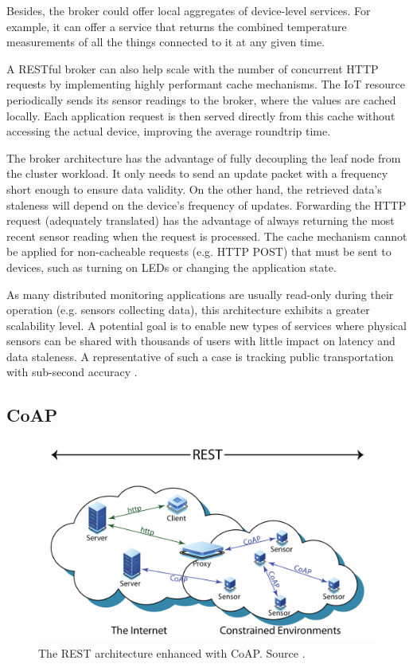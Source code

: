 Besides, the broker could offer local aggregates of device-level services. For example, it can offer a service that returns the combined temperature measurements of all the things connected to it at any given time.

A RESTful broker can also help scale with the number of concurrent HTTP requests by implementing highly performant cache mechanisms. The IoT resource periodically sends its sensor readings to the broker, where the values are cached locally. Each application request is then served directly from this cache without accessing the actual device, improving the average roundtrip time.

The broker architecture has the advantage of fully decoupling the leaf node from the cluster workload. It only needs to send an update packet with a frequency short enough to ensure data validity. On the other hand, the retrieved data's staleness will depend on the device's frequency of updates. Forwarding the HTTP request (adequately translated) has the advantage of always returning the most recent sensor reading when the request is processed. The cache mechanism cannot be applied for non-cacheable requests (e.g. HTTP POST) that must be sent to devices, such as turning on LEDs or changing the application state.

As many distributed monitoring applications are usually read-only during their operation (e.g. sensors collecting data), this architecture exhibits a greater scalability level. A potential goal is to enable new types of services where physical sensors can be shared with thousands of users with little impact on latency and data staleness. A representative of such a case is tracking public transportation with sub-second accuracy \cite{elbamby2019wireless}.

\subsection{CoAP}
\label{sec:coap}

\begin{figure}[ht]
\centering
\includegraphics[width=\columnwidth]{figures/coap}
\caption{The REST architecture enhanced with CoAP. Source \cite{bormann2012coap}.}
\label{fig:coap}
\end{figure}

